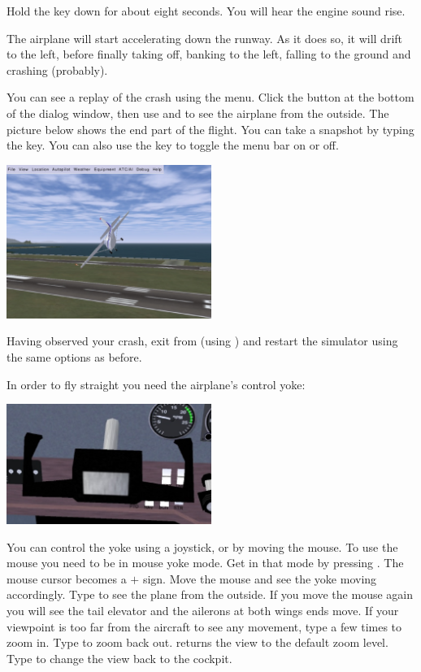 Hold the  key down for about eight seconds. You will
hear the engine sound rise.

The airplane will start accelerating down the runway. As it does so, it will
drift to the left, before finally taking off, banking to the left,
falling to the ground and crashing (probably).

You can see a replay of the crash using the  
menu. Click the  button at the bottom of the dialog window, then
use  and  to see the airplane from the outside. The
picture below shows the end part of the flight. You can take a snapshot by
typing the  key.
You can also use the  key to toggle the menu bar on or off.

\begin{center}
\includegraphics[width=0.5\textwidth]{img/tut_9}
\end{center}

Having observed your crash, exit from \FlightGear (using )
and restart the simulator using the same options as before.

In order to fly straight you need the airplane's control yoke:

\begin{center}
\includegraphics[width=0.5\textwidth]{img/tut_10}
\end{center}

You can control the yoke using a joystick, or by moving the mouse. To use the
mouse you need to be in mouse yoke mode. Get in that mode by pressing .
The mouse cursor becomes a $+$ sign. Move the mouse and see the
yoke moving accordingly. Type  to see the plane from the outside. If you
move the mouse again you will see the tail elevator and the ailerons at both
wings ends move. If your viewpoint is too far from the aircraft to see any
movement, type  a few times to zoom in.
Type  to zoom back out.  returns the view to the default zoom
level. Type  to change the view back to the cockpit.


